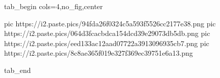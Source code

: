 
 
 
 
 


\ifcmt
  tab_begin cols=4,no_fig,center

     pic https://i2.paste.pics/94fda26f0324c5a593f5526cc2177e38.png
		 pic https://i2.paste.pics/064d3fcacbdca154dcd39e29073db5db.png
		 pic https://i2.paste.pics/eed133ac12aad07722a3913096935cb7.png
		 pic https://i2.paste.pics/8c8ae365f019e327f369ec39751e6a13.png

  tab_end
\fi
